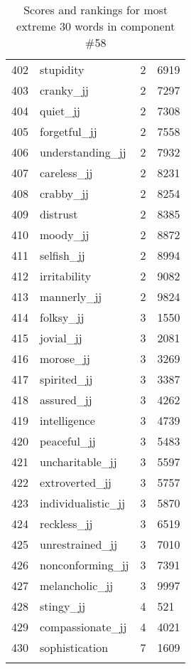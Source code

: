 \begin{longtable}[!htbp]{| rlr@{.}l |}
    402 & stupidity & 2 & 6919 \\
    403 & cranky\_jj & 2 & 7297 \\
    404 & quiet\_jj & 2 & 7308 \\
    405 & forgetful\_jj & 2 & 7558 \\
    406 & understanding\_jj & 2 & 7932 \\
    407 & careless\_jj & 2 & 8231 \\
    408 & crabby\_jj & 2 & 8254 \\
    409 & distrust & 2 & 8385 \\
    410 & moody\_jj & 2 & 8872 \\
    411 & selfish\_jj & 2 & 8994 \\
    412 & irritability & 2 & 9082 \\
    413 & mannerly\_jj & 2 & 9824 \\
    414 & folksy\_jj & 3 & 1550 \\
    415 & jovial\_jj & 3 & 2081 \\
    416 & morose\_jj & 3 & 3269 \\
    417 & spirited\_jj & 3 & 3387 \\
    418 & assured\_jj & 3 & 4262 \\
    419 & intelligence & 3 & 4739 \\
    420 & peaceful\_jj & 3 & 5483 \\
    421 & uncharitable\_jj & 3 & 5597 \\
    422 & extroverted\_jj & 3 & 5757 \\
    423 & individualistic\_jj & 3 & 5870 \\
    424 & reckless\_jj & 3 & 6519 \\
    425 & unrestrained\_jj & 3 & 7010 \\
    426 & nonconforming\_jj & 3 & 7391 \\
    427 & melancholic\_jj & 3 & 9997 \\
    428 & stingy\_jj & 4 & 521 \\
    429 & compassionate\_jj & 4 & 4021 \\
    430 & sophistication & 7 & 1609 \\
    \hline
    \caption{Scores and rankings for most extreme 30 words in component \#58} \\
\end{longtable}
